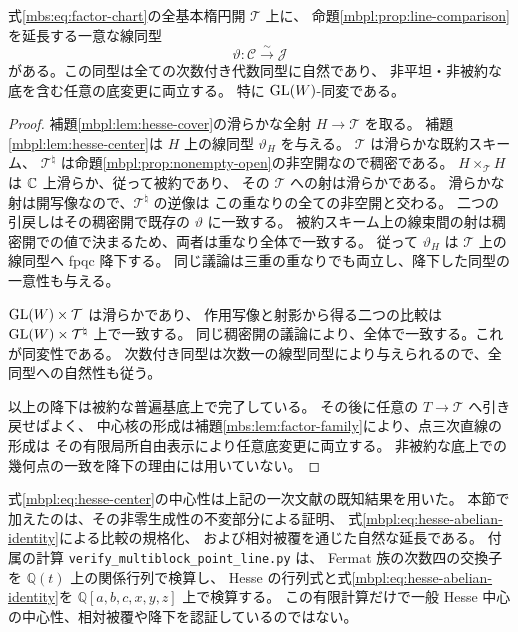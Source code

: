 \begin{theorem}[基本楕円開全体の自然な中心線比較]
\label{mbpl:thm:global-line-comparison}
式\eqref{mbs:eq:factor-chart}の全基本楕円開 $\mathcal T$ 上に、
命題\ref{mbpl:prop:line-comparison}を延長する一意な線同型
\[
 \vartheta:\mathcal C\xrightarrow{\sim}\mathcal J
\]
がある。この同型は全ての次数付き代数同型に自然であり、
非平坦・非被約な底を含む任意の底変更に両立する。
特に $\operatorname{GL}(W)$-同変である。
\end{theorem}

\begin{proof}
補題\ref{mbpl:lem:hesse-cover}の滑らかな全射 $H\to\mathcal T$ を取る。
補題\ref{mbpl:lem:hesse-center}は $H$ 上の線同型 $\vartheta_H$ を与える。
$\mathcal T$ は滑らかな既約スキーム、
$\mathcal T^\natural$ は命題\ref{mbpl:prop:nonempty-open}の非空開なので稠密である。
$H\times_{\mathcal T}H$ は $\mathbb C$ 上滑らか、従って被約であり、
その $\mathcal T$ への射は滑らかである。
滑らかな射は開写像なので、$\mathcal T^\natural$ の逆像は
この重なりの全ての非空開と交わる。
二つの引戻しはその稠密開で既存の $\vartheta$ に一致する。
被約スキーム上の線束間の射は稠密開での値で決まるため、両者は重なり全体で一致する。
従って $\vartheta_H$ は $\mathcal T$ 上の線同型へ fpqc 降下する。
同じ議論は三重の重なりでも両立し、降下した同型の一意性も与える。

$\operatorname{GL}(W)\times\mathcal T$ は滑らかであり、
作用写像と射影から得る二つの比較は $\operatorname{GL}(W)\times\mathcal T^\natural$ 上で一致する。
同じ稠密開の議論により、全体で一致する。これが同変性である。
次数付き同型は次数一の線型同型により与えられるので、全同型への自然性も従う。

以上の降下は被約な普遍基底上で完了している。
その後に任意の $T\to\mathcal T$ へ引き戻せばよく、
中心核の形成は補題\ref{mbs:lem:factor-family}により、点三次直線の形成は
その有限局所自由表示により任意底変更に両立する。
非被約な底上での幾何点の一致を降下の理由には用いていない。
\end{proof}

\begin{remark}[中心公式と有限計算の役割]
式\eqref{mbpl:eq:hesse-center}の中心性は上記の一次文献の既知結果を用いた。
本節で加えたのは、その非零生成性の不変部分による証明、
式\eqref{mbpl:eq:hesse-abelian-identity}による比較の規格化、
および相対被覆を通じた自然な延長である。
付属の計算 \texttt{verify\_multiblock\_point\_line.py} は、
Fermat 族の次数四の交換子を $\mathbb Q(t)$ 上の関係行列で検算し、
Hesse の行列式と式\eqref{mbpl:eq:hesse-abelian-identity}を
$\mathbb Q[a,b,c,x,y,z]$ 上で検算する。
この有限計算だけで一般 Hesse 中心の中心性、相対被覆や降下を認証しているのではない。
\end{remark}

